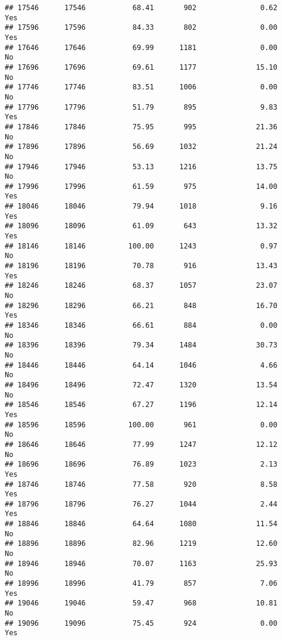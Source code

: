 \documentclass[
]{article}
\begin{document}
\begin{verbatim}
## 17546      17546           68.41       902               0.62               Yes
## 17596      17596           84.33       802               0.00               Yes
## 17646      17646           69.99      1181               0.00                No
## 17696      17696           69.61      1177              15.10                No
## 17746      17746           83.51      1006               0.00                No
## 17796      17796           51.79       895               9.83               Yes
## 17846      17846           75.95       995              21.36                No
## 17896      17896           56.69      1032              21.24                No
## 17946      17946           53.13      1216              13.75                No
## 17996      17996           61.59       975              14.00               Yes
## 18046      18046           79.94      1018               9.16               Yes
## 18096      18096           61.09       643              13.32               Yes
## 18146      18146          100.00      1243               0.97                No
## 18196      18196           70.78       916              13.43               Yes
## 18246      18246           68.37      1057              23.07                No
## 18296      18296           66.21       848              16.70               Yes
## 18346      18346           66.61       884               0.00                No
## 18396      18396           79.34      1484              30.73                No
## 18446      18446           64.14      1046               4.66                No
## 18496      18496           72.47      1320              13.54                No
## 18546      18546           67.27      1196              12.14               Yes
## 18596      18596          100.00       961               0.00                No
## 18646      18646           77.99      1247              12.12                No
## 18696      18696           76.89      1023               2.13               Yes
## 18746      18746           77.58       920               8.58               Yes
## 18796      18796           76.27      1044               2.44               Yes
## 18846      18846           64.64      1080              11.54                No
## 18896      18896           82.96      1219              12.60                No
## 18946      18946           70.07      1163              25.93                No
## 18996      18996           41.79       857               7.06               Yes
## 19046      19046           59.47       968              10.81                No
## 19096      19096           75.45       924               0.00               Yes

\end{verbatim}
\end{document}

